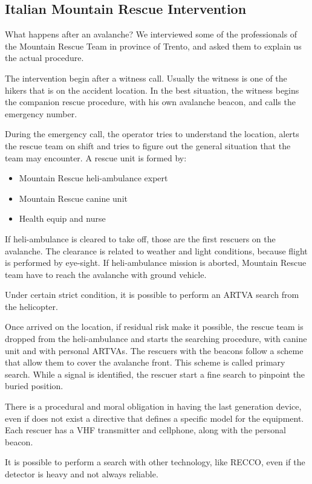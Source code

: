 \subsection{Italian Mountain Rescue Intervention}
What happens after an avalanche? We interviewed some of the professionals of the Mountain Rescue Team in province of Trento, and asked them to explain us the actual procedure.

The intervention begin after a witness call. Usually the witness is one of the hikers that is on the accident location. In the best situation, the witness begins the companion rescue procedure, with his own avalanche beacon, and calls the emergency number.

During the emergency call, the operator tries to understand the location, alerts the rescue team on shift and tries to figure out the general situation that the team may encounter. A rescue unit is formed by:
\begin{itemize}
\item Mountain Rescue heli-ambulance expert
\item Mountain Rescue canine unit
\item Health equip and nurse
\end{itemize}
If heli-ambulance is cleared to take off, those are the first rescuers on the avalanche. The clearance is related to weather and light conditions, because flight is performed by eye-sight. If heli-ambulance mission is aborted, Mountain Rescue team have to reach the avalanche with ground vehicle.

Under certain strict condition, it is possible to perform an ARTVA search from the helicopter.

Once arrived on the location, if residual risk make it possible, the rescue team is dropped from the heli-ambulance and starts the searching procedure, with canine unit and with personal ARTVAs. The rescuers with the beacons follow a scheme that allow them to cover the avalanche front. This scheme is called primary search. While a signal is identified, the rescuer start a fine search to pinpoint the buried position.

There is a procedural and moral obligation in having the last generation device, even if does not exist a directive that defines a specific model for the equipment. Each rescuer has a VHF transmitter and cellphone, along with the personal beacon. 

It is possible to perform a search with other technology, like RECCO, even if the detector is heavy and not always reliable.

